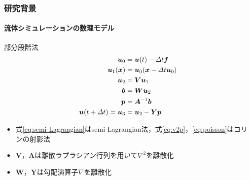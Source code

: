 \documentclass[aspectratio=169,dvipdfmx,hyperref={bookmarks=true}]{beamer}
\begin{document}
  \begin{frame}
  \frametitle{研究背景}
  \framesubtitle{流体シミュレーションの数理モデル}
    \begin{block}{部分段階法}
\begin{align}
	\bm{u}_0	& =  \bm{u} (t)  - \varDelta t \bm{f}\notag \\ 
	\bm{u}_1(\bm{x}) 	&= \bm{u}_0(\bm{x}  - \varDelta t \bm{u}_0)\label{eq:semi-Lagrangian}\\
	\bm{u}_2   		&=  \bm{V}\bm{u}_1		\notag\\
	\bm{b} 			&= \bm{W}\bm{u}_2		\label{eq:v2p}	\\ 
	\bm{p} 			&= \bm{A}^{-1}\bm{b}	\label{eq:poisson} \\ 
	\bm{u} (t + \varDelta t) = \bm{u}_3  	&=  \bm{u}_2 - \bm{Y}\bm{p}\notag
\end{align}
\begin{itemize}
\item 式\ref{eq:semi-Lagrangian}はsemi-Lagrangian法\cite{stam}，式\ref{eq:v2p}，\ref{eq:poisson}はコリンの射影法\cite{Chorin}
\item $\bm{V}$，$\bm{A}$は離散ラプラシアン行列を用いて$\nabla^2$を離散化
\item $\bm{W}$，$\bm{Y}$は勾配演算子$\nabla$を離散化
\end{itemize}
\end{block}
\end{frame}
\end{document}
